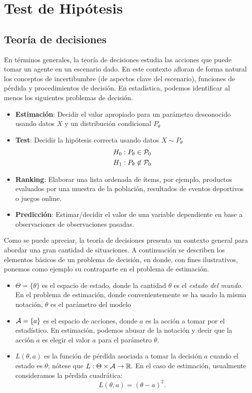\chapter{Test de Hipótesis}


\section{Teoría de decisiones}
\label{sec:teoría_de_decisiones}

En términos generales, la teoría de decisiones estudia las acciones que puede tomar un agente en un escenario dado. En este contexto afloran de forma natural los conceptos de incertibumbre (de aspectos clave del escenario), funciones de pérdida y procedimientos de decisión. En estadística, podemos identificar al menos los siguientes problemas de decisión.


\begin{itemize}
	\item \textbf{Estimación}: Decidir el valor apropiado para un parámetro desconocido usando datos $X$ y un distribución condicional $P_\theta$
	\item \textbf{Test}: Decidir la hipótesis correcta usando datos $X\sim P_\theta$
	\begin{align}
		H_0: P_\theta\in{\mathcal P}_0\\
		H_1: P_\theta\not\in{\mathcal P}_0
	\end{align}
	\item \textbf{Ranking}: Elaborar una lista ordenada de ítems, por ejemplo, productos evaluados por una muestra de la población, resultados de eventos deportivos o juegos online. 
	\item \textbf{Predicción}: Estimar/decidir el valor de una variable dependiente en base a observaciones de observaciones pasadas. 
\end{itemize}

Como se puede apreciar, la teoría de decisiones presenta un contexto general para abordar una gran cantidad de situaciones. A continuación se describen los elementos básicos de un problema de decisión, en donde, con fines ilustrativos, ponemos como ejemplo su contraparte en el problema de estimación.

\begin{itemize}
	\item $\Theta = \{\theta\}$ es el espacio de estado, donde la cantidad $\theta$ es el \textit{estado del mundo}. En el problema de estimación, donde convenientemente se ha usado la misma notación, $\theta$ es el parámetro del modelo
	\item ${\mathcal A}=\{a\}$ es el espacio de acciones, donde $a$ es la acción a tomar por el estadístico. En estimación, podemos abusar de la notación y decir que la acción $a$ es elegir el valor $a$ para el parámetro $\theta$. 
	\item $L(\theta,a)$ es la función de pérdida asociada a tomar la decisión $a$ cuando el estado es $\theta$; nótese que $L:\Theta\times{\mathcal A}\rightarrow{\mathbb R}$. En el caso de estimación, usualmente consideramos la pérdida cuadrática:
	\begin{equation}
		L(\theta,a) = (\theta-a)^2.
	\end{equation}
\end{itemize}

